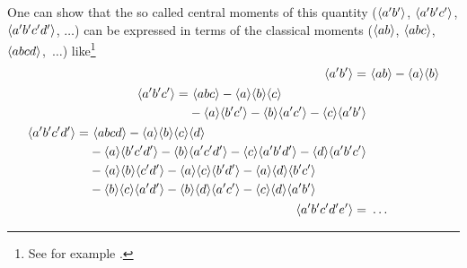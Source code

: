 One can show that the so called central moments of this quantity
($\fil{a' b'}$, $\fil{a' b' c'}$, $\fil{a' b' c' d'}$, $\ldots$)
can be expressed in terms of the classical moments  
($\fil{a b}$, $\fil{a b c}$, $\fil{a b c d}$,~$\ldots$)
like\footnote{See for example \citep{Monin1971}.}
\begin{align}
\fil{a' b'}=&\ \fil{a b}-\fil{a}\fil{b}\label{eq:mom2}\\
\begin{split}
\fil{a' b' c'}=&\ \fil{a b c} - \fil{a}\fil{b}\fil{c}\\
&-\fil{a}\fil{b' c'} - \fil{b}\fil{a' c'} - \fil{c}\fil{a' b'}
\end{split}
 \\
\begin{split}
\fil{a' b' c' d'}=&\ \fil{a b c d} - \fil{a}\fil{b}\fil{c}\fil{d}\\
&-\fil{a}\fil{b' c' d'} -\fil{b}\fil{a' c' d'}
-\fil{c}\fil{a' b' d'} -\fil{d}\fil{a' b' c'}\\
&-\fil{a}\fil{b}\fil{c' d'}-\fil{a}\fil{c}\fil{b' d'}-\fil{a}\fil{d}\fil{b'
c'}\\
&-\fil{b}\fil{c}\fil{a' d'}-\fil{b}\fil{d}\fil{a' c'}-\fil{c}\fil{d}\fil{a' b'}
\end{split}
\\
\fil{a' b' c' d' e'} =&\ \ldots \label{eq:mom5}
\end{align}
